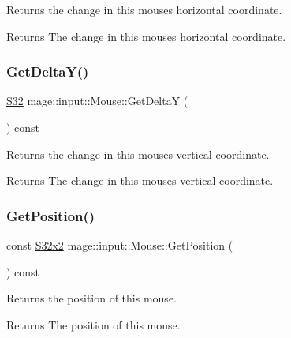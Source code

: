Returns the change in this mouse\textquotesingle{}s horizontal coordinate.

\begin{DoxyReturn}{Returns}
The change in this mouse\textquotesingle{}s horizontal coordinate. 
\end{DoxyReturn}
\mbox{\label{classmage_1_1input_1_1_mouse_a448886ed21c136f1a385101e21093aa3}} 
\subsubsection{\texorpdfstring{Get\+Delta\+Y()}{GetDeltaY()}}
{\footnotesize\ttfamily \mbox{\hyperlink{namespacemage_a2ef1a005a77358f1825d13fd481b557f}{S32}} mage\+::input\+::\+Mouse\+::\+Get\+DeltaY (\begin{DoxyParamCaption}{ }\end{DoxyParamCaption}) const\hspace{0.3cm}{\ttfamily [noexcept]}}

Returns the change in this mouse\textquotesingle{}s vertical coordinate.

\begin{DoxyReturn}{Returns}
The change in this mouse\textquotesingle{}s vertical coordinate. 
\end{DoxyReturn}
\mbox{\label{classmage_1_1input_1_1_mouse_a8127f78dd1fb1eba29c3888d40db97da}} 
\subsubsection{\texorpdfstring{Get\+Position()}{GetPosition()}}
{\footnotesize\ttfamily const \mbox{\hyperlink{namespacemage_a4843c424aae7bb5fb6c440ed6ed593ee}{S32x2}} mage\+::input\+::\+Mouse\+::\+Get\+Position (\begin{DoxyParamCaption}{ }\end{DoxyParamCaption}) const\hspace{0.3cm}{\ttfamily [noexcept]}}

Returns the position of this mouse.

\begin{DoxyReturn}{Returns}
The position of this mouse. 
\end{DoxyReturn}
\mbox{\label{classmage_1_1input_1_1_mouse_a208f26babea7ac6e07af5f79600e22ae}} 
